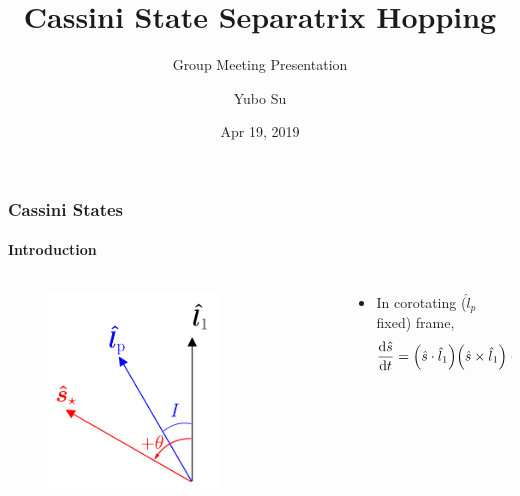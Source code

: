 \documentclass[dvipsnames]{beamer}
\newcommand*{\rd}[2]{\frac{\mathrm{d}#1}{\mathrm{d}#2}}
\DeclarePairedDelimiter\p{\lparen}{\rparen}
\begin{document}
\title{Cassini State Separatrix Hopping}
\subtitle{Group Meeting Presentation}
\author{Yubo Su}
\date{Apr 19, 2019}

\maketitle

\begin{frame}
    \frametitle{Cassini States}
    \framesubtitle{Introduction}

    \begin{columns}
        \begin{column}{0.45\textwidth}
            \begin{figure}[t]
                \centering
                \includegraphics[width=0.7\textwidth]{../plots/cassini.png}
            \end{figure}
        \end{column}
        \begin{column}{0.45\textwidth}
            \begin{itemize}
                \item In corotating ($\hat{l}_p$ fixed) frame,
                    \begin{equation*}
                        \rd{\hat{s}}{t}
                            = \p*{\hat{s} \cdot \hat{l}_1}
                                \p*{\hat{s} \times \hat{l}_1} - \eta
                                    \p*{\hat{s} \times \hat{l}_p}.
                    \end{equation*}
                \begin{itemize}

\end{itemize}
\end{itemize}
\end{column}
\end{columns}
\end{frame}
\end{document}

